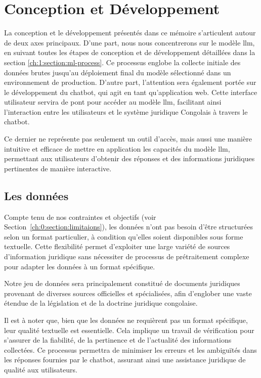 
\chapter{Conception et Développement} %

\label{ch:2} %

La conception et le développement présentés dans ce mémoire s'articulent autour de deux axes principaux. D'une part, nous nous concentrerons sur le modèle \ac{llm}, en suivant toutes les étapes de conception et de développement détaillées dans la section \ref{ch:1:section:ml-process}. Ce processus englobe la collecte initiale des données brutes jusqu'au déploiement final du modèle sélectionné dans un environnement de production. D'autre part, l'attention sera également portée sur le développement du chatbot, qui agit en tant qu'application web. Cette interface utilisateur servira de pont pour accéder au modèle \ac{llm}, facilitant ainsi l'interaction entre les utilisateurs et le système juridique Congolais à travers le chatbot. 

Ce dernier ne représente pas seulement un outil d'accès, mais aussi une manière intuitive et efficace de mettre en application les capacités du modèle \ac{llm}, permettant aux utilisateurs d'obtenir des réponses et des informations juridiques pertinentes de manière interactive.

\section{Les données}

Compte tenu de nos contraintes et objectifs (voir Section~\ref{ch:0:section:limitaions}), les données n'ont pas besoin d'être structurées selon un format particulier, à condition qu'elles soient disponibles sous forme textuelle. Cette flexibilité permet d'exploiter une large variété de sources d'information juridique sans nécessiter de processus de prétraitement complexe pour adapter les données à un format spécifique.

Notre jeu de données sera principalement constitué de documents juridiques provenant de diverses sources officielles et spécialisées, afin d'englober une vaste étendue de la législation et de la doctrine juridique congolaise.

Il est à noter que, bien que les données ne requièrent pas un format spécifique, leur qualité textuelle est essentielle. Cela implique un travail de vérification pour s'assurer de la fiabilité, de la pertinence et de l'actualité des informations collectées. Ce processus permettra de minimiser les erreurs et les ambiguïtés dans les réponses fournies par le chatbot, assurant ainsi une assistance juridique de qualité aux utilisateurs.

